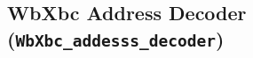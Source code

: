 
\subsection[WbXbc Address Decoder]{WbXbc Address Decoder (\texttt{WbXbc\_addesss\_decoder})}
\label{adec}

